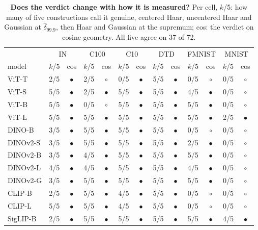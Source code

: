 \begin{table}[H]
\centering
\scriptsize
\setlength{\tabcolsep}{1.4pt}
\begingroup
\setlength{\tabcolsep}{2.4pt}
\begin{tabular}{lcccccccccccc}
\toprule
 & \multicolumn{2}{c}{IN} & \multicolumn{2}{c}{C100} & \multicolumn{2}{c}{C10} & \multicolumn{2}{c}{DTD} & \multicolumn{2}{c}{FMNIST} & \multicolumn{2}{c}{MNIST} \\
model & $k$/5 & cos & $k$/5 & cos & $k$/5 & cos & $k$/5 & cos & $k$/5 & cos & $k$/5 & cos \\
\midrule
ViT-T & 2/5 & $\bullet$ & 2/5 & $\circ$ & 0/5 & $\bullet$ & 5/5 & $\bullet$ & 0/5 & $\circ$ & 0/5 & $\circ$ \\
ViT-S & 5/5 & $\bullet$ & 2/5 & $\bullet$ & 5/5 & $\bullet$ & 5/5 & $\bullet$ & 4/5 & $\bullet$ & 0/5 & $\circ$ \\
ViT-B & 5/5 & $\bullet$ & 0/5 & $\circ$ & 5/5 & $\bullet$ & 5/5 & $\bullet$ & 5/5 & $\bullet$ & 0/5 & $\circ$ \\
ViT-L & 5/5 & $\bullet$ & 5/5 & $\bullet$ & 5/5 & $\bullet$ & 5/5 & $\bullet$ & 5/5 & $\bullet$ & 2/5 & $\bullet$ \\
\midrule
DINO-B & 3/5 & $\bullet$ & 5/5 & $\bullet$ & 5/5 & $\bullet$ & 5/5 & $\bullet$ & 0/5 & $\circ$ & 0/5 & $\circ$ \\
DINOv2-S & 3/5 & $\bullet$ & 5/5 & $\bullet$ & 5/5 & $\bullet$ & 5/5 & $\bullet$ & 2/5 & $\bullet$ & 0/5 & $\circ$ \\
DINOv2-B & 3/5 & $\bullet$ & 4/5 & $\bullet$ & 5/5 & $\bullet$ & 5/5 & $\bullet$ & 5/5 & $\bullet$ & 0/5 & $\circ$ \\
DINOv2-L & 4/5 & $\bullet$ & 4/5 & $\bullet$ & 5/5 & $\bullet$ & 5/5 & $\bullet$ & 4/5 & $\bullet$ & 0/5 & $\circ$ \\
DINOv2-G & 3/5 & $\bullet$ & 5/5 & $\bullet$ & 5/5 & $\bullet$ & 5/5 & $\bullet$ & 5/5 & $\bullet$ & 0/5 & $\circ$ \\
\midrule
CLIP-B & 2/5 & $\bullet$ & 5/5 & $\bullet$ & 4/5 & $\bullet$ & 5/5 & $\bullet$ & 0/5 & $\circ$ & 0/5 & $\circ$ \\
CLIP-L & 5/5 & $\bullet$ & 5/5 & $\bullet$ & 4/5 & $\bullet$ & 5/5 & $\bullet$ & 0/5 & $\circ$ & 0/5 & $\circ$ \\
SigLIP-B & 2/5 & $\bullet$ & 5/5 & $\bullet$ & 5/5 & $\bullet$ & 5/5 & $\bullet$ & 5/5 & $\bullet$ & 4/5 & $\bullet$ \\
\bottomrule
\end{tabular}
\par\vspace{2pt}
\endgroup
\caption{\textbf{Does the verdict change with how it is measured?} Per cell, $k$/5: how many of five constructions call it genuine, centered Haar, uncentered Haar and Gaussian at $\hat\delta_{99.9}$, then Haar and Gaussian at the supremum; cos: the verdict on cosine geometry. All five agree on 37 of 72.
}
\label{tab:q1-census-b}\label{tab:q1-census-c}
\end{table}
